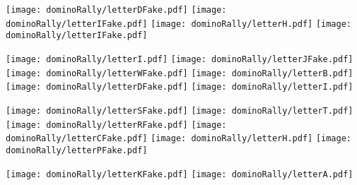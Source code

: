 \begin{puzzle}
\begin{center}
  \texttt{[image: dominoRally/letterDFake.pdf]}\hspace{0.03\linewidth}
  \texttt{[image: dominoRally/letterIFake.pdf]}\hspace{0.03\linewidth}
  \texttt{[image: dominoRally/letterH.pdf]}\hspace{0.03\linewidth}
  \texttt{[image: dominoRally/letterIFake.pdf]}\hspace{0.03\linewidth}
\end{center}
\begin{center}
  \texttt{[image: dominoRally/letterI.pdf]}\hspace{0.03\linewidth}
  \texttt{[image: dominoRally/letterJFake.pdf]}\hspace{0.03\linewidth}
  \texttt{[image: dominoRally/letterWFake.pdf]}\hspace{0.03\linewidth}
  \texttt{[image: dominoRally/letterB.pdf]}\hspace{0.03\linewidth}
  \texttt{[image: dominoRally/letterDFake.pdf]}\hspace{0.03\linewidth}
  \texttt{[image: dominoRally/letterI.pdf]}\hspace{0.03\linewidth}
\end{center}
\begin{center}
  \texttt{[image: dominoRally/letterSFake.pdf]}\hspace{0.03\linewidth}
  \texttt{[image: dominoRally/letterT.pdf]}\hspace{0.03\linewidth}
  \texttt{[image: dominoRally/letterRFake.pdf]}\hspace{0.03\linewidth}
  \texttt{[image: dominoRally/letterCFake.pdf]}\hspace{0.03\linewidth}
  \texttt{[image: dominoRally/letterH.pdf]}\hspace{0.03\linewidth}
  \texttt{[image: dominoRally/letterPFake.pdf]}\hspace{0.03\linewidth}
\end{center}
\begin{center}
  \texttt{[image: dominoRally/letterKFake.pdf]}\hspace{0.03\linewidth}
  \texttt{[image: dominoRally/letterA.pdf]}\hspace{0.03\linewidth}

\end{center}
\end{puzzle}

